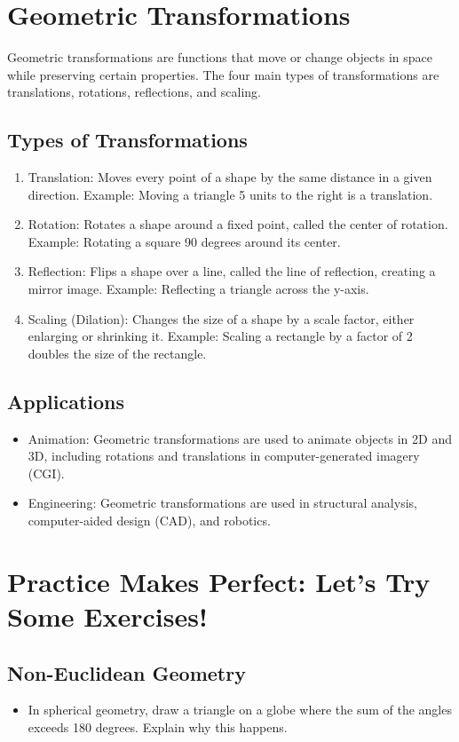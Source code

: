 \section{Geometric Transformations}
Geometric transformations are functions that move or change objects in space while preserving certain properties. The four main types of transformations are translations, rotations, reflections, and scaling.

\subsection{Types of Transformations}
\begin{enumerate}
    \item Translation: Moves every point of a shape by the same distance in a given direction.
    Example: Moving a triangle 5 units to the right is a translation.
    \item Rotation: Rotates a shape around a fixed point, called the center of rotation.
    Example: Rotating a square 90 degrees around its center.
    \item Reflection: Flips a shape over a line, called the line of reflection, creating a mirror image.
    Example: Reflecting a triangle across the y-axis.
    \item Scaling (Dilation): Changes the size of a shape by a scale factor, either enlarging or shrinking it.
    Example: Scaling a rectangle by a factor of 2 doubles the size of the rectangle.
\end{enumerate}

\subsection{Applications}
\begin{itemize}
    \item Animation: Geometric transformations are used to animate objects in 2D and 3D, including rotations and translations in computer-generated imagery (CGI).
    \item Engineering: Geometric transformations are used in structural analysis, computer-aided design (CAD), and robotics.
\end{itemize}

\section{Practice Makes Perfect: Let’s Try Some Exercises!}
\subsection{Non-Euclidean Geometry}
\begin{itemize}
    \item In spherical geometry, draw a triangle on a globe where the sum of the angles exceeds 180 degrees. Explain why this happens.
\end{itemize}

